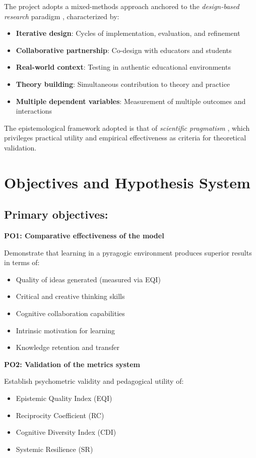 The project adopts a mixed-methods approach anchored to the \textit{design-based research} paradigm \cite{Brown1992}, characterized by:

\begin{itemize}
    \item \textbf{Iterative design}: Cycles of implementation, evaluation, and refinement
    \item \textbf{Collaborative partnership}: Co-design with educators and students  
    \item \textbf{Real-world context}: Testing in authentic educational environments
    \item \textbf{Theory building}: Simultaneous contribution to theory and practice
    \item \textbf{Multiple dependent variables}: Measurement of multiple outcomes and interactions
\end{itemize}

The epistemological framework adopted is that of \textit{scientific pragmatism} \cite{Dewey1938}, which privileges practical utility and empirical effectiveness as criteria for theoretical validation.

\section{Objectives and Hypothesis System}
\subsection*{Primary objectives:}

\textbf{PO1: Comparative effectiveness of the model}

Demonstrate that learning in a pyragogic environment produces superior results in terms of:
\begin{itemize}
    \item Quality of ideas generated (measured via EQI)
    \item Critical and creative thinking skills
    \item Cognitive collaboration capabilities
    \item Intrinsic motivation for learning
    \item Knowledge retention and transfer
\end{itemize}

\textbf{PO2: Validation of the metrics system}

Establish psychometric validity and pedagogical utility of:
\begin{itemize}
    \item Epistemic Quality Index (EQI)
    \item Reciprocity Coefficient (RC) 
    \item Cognitive Diversity Index (CDI)
    \item Systemic Resilience (SR)
\end{itemize}

